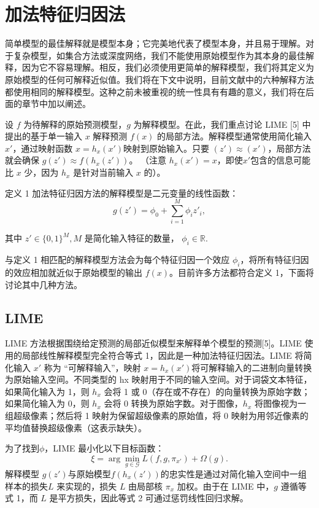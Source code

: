 \documentclass[12pt, a4paper]{ctexart} %
\begin{document}
\section{加法特征归因法}
简单模型的最佳解释就是模型本身；它完美地代表了模型本身，并且易于理解。对于复杂模型，如集合方法或深度网络，我们不能使用原始模型作为其本身的最佳解释，因为它不容易理解。相反，我们必须使用更简单的解释模型，我们将其定义为原始模型的任何可解释近似值。我们将在下文中说明，目前文献中的六种解释方法都使用相同的解释模型。这种之前未被重视的统一性具有有趣的意义，我们将在后面的章节中加以阐述。

设 $f$ 为待解释的原始预测模型，$g$ 为解释模型。在此，我们重点讨论 LIME [5] 中提出的基于单一输入 $x$ 解释预测 $f (x)$ 的局部方法。解释模型通常使用简化输入 $x'$，通过映射函数 $x = h_x(x')$映射到原始输入。只要 $(z') \approx (x')$，局部方法就会确保 $g(z') \approx f(h_x(z'))$。 （注意 $h_x(x′) = x$，即使$ x' $包含的信息可能比 $x$ 少，因为 $h_x$ 是针对当前输入 $x$ 的）。

定义 1 加法特征归因方法的解释模型是二元变量的线性函数：
\[
g(z') = \phi_0 + \sum_{i=1}^{M} \phi_i z'_i,
\]

$\textit{其中 } z' \in \{0,1\}^{M}, M \text{ 是简化输入特征的数量， } \phi_i \in \mathbb{R}.$

与定义 1 相匹配的解释模型方法会为每个特征归因一个效应 $\phi_i$，将所有特征归因的效应相加就近似于原始模型的输出 $f (x)$。目前许多方法都符合定义 1，下面将讨论其中几种方法。

\subsection{LIME}
LIME 方法根据围绕给定预测的局部近似模型来解释单个模型的预测[5]。LIME 使用的局部线性解释模型完全符合等式 1，因此是一种加法特征归因法。LIME 将简化输入 $x'$ 称为 “可解释输入”，映射 $x = h_x(x')$将可解释输入的二进制向量转换为原始输入空间。不同类型的 hx 映射用于不同的输入空间。对于词袋文本特征，如果简化输入为 1，则 $h_x$ 会将 1 或 0（存在或不存在）的向量转换为原始字数；如果简化输入为 0，则 $h_x$ 会将 0 转换为原始字数。对于图像，$h_x$ 将图像视为一组超级像素；然后将 1 映射为保留超级像素的原始值，将 0 映射为用邻近像素的平均值替换超级像素（这表示缺失）。

为了找到$\phi$，LIME 最小化以下目标函数：
\[
\xi = \arg\min_{g \in \mathcal{G}} L(f, g, \pi_{x'}) + \Omega(g).
\]
解释模型 $g(z')$与原始模型$ f(h_x(z'))$的忠实性是通过对简化输入空间中一组样本的损失$L$ 来实现的，损失 $L$ 由局部核 $π_x$ 加权。由于在 LIME 中，$g$ 遵循等式 1，而 $L$ 是平方损失，因此等式 2 可通过惩罚线性回归求解。
\end{document}
